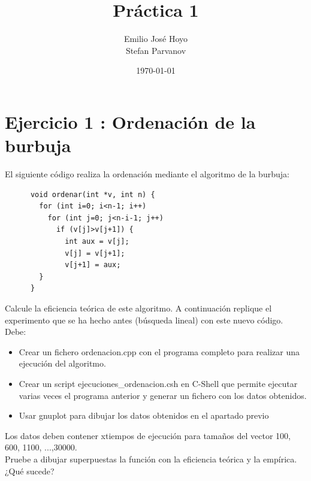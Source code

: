\documentclass{article}
\begin{document}
\lstset{language=C++}
\lstset{numbers=left}

\title{Práctica 1}
\author{Emilio José Hoyo \\ Stefan Parvanov}
\date{\today}
\maketitle

\section{Ejercicio 1 : Ordenación de la burbuja}
El siguiente código realiza la ordenación mediante el algoritmo de la burbuja:
\begin{lstlisting}
      void ordenar(int *v, int n) {
        for (int i=0; i<n-1; i++)
          for (int j=0; j<n-i-1; j++)
            if (v[j]>v[j+1]) {
              int aux = v[j];
              v[j] = v[j+1];
              v[j+1] = aux;
		} 
      }
\end{lstlisting}

Calcule la eficiencia teórica de este algoritmo. A continuación replique el experimento que se ha hecho antes (búsqueda lineal) con este nuevo código. Debe:
\begin{itemize}
	\item Crear un fichero ordenacion.cpp con el programa completo para realizar una ejecución del algoritmo.
	\item Crear un script ejecuciones\_ordenacion.csh en C-Shell que permite ejecutar varias veces el programa anterior y generar un fichero con los datos obtenidos.
	\item Usar gnuplot para dibujar los datos obtenidos en el apartado previo
\end{itemize}
Los datos deben contener xtiempos de ejecución para tamaños del vector 100, 600, 1100, ...,30000. \\
Pruebe a dibujar superpuestas la función con la eficiencia teórica y la empírica. ¿Qué sucede? 
\clearpage
\end{document}
